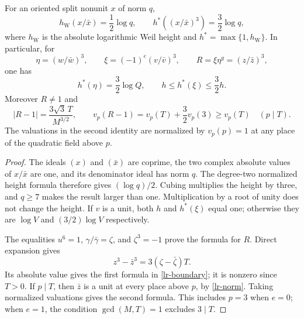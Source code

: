 \begin{lemma}\label{lr-heights}
For an oriented split nonunit $x$ of norm $q$,
\[
 h_{\mathrm W}(x/\bar x)=\frac12\log q,\qquad
 h^*((x/\bar x)^3)=\frac32\log q,
\]
where $h_{\mathrm W}$ is the absolute logarithmic Weil height and
$h^*=\max\{1,h_{\mathrm W}\}$. In particular, for
\[
 \eta=(w/\bar w)^3,\qquad \xi=(-1)^e(v/\bar v)^3,
 \qquad R=\xi\eta^g=(z/\bar z)^3,
\]
one has
\begin{equation}\label{lr-height-bounds}
 h^*(\eta)=\frac32\log Q,\qquad h\le h^*(\xi)\le\frac32h.
\end{equation}
Moreover $R\ne1$ and
\begin{equation}\label{lr-boundary}
 |R-1|=\frac{3\sqrt3\,T}{M^{3/2}},\qquad
 v_p(R-1)=v_p(T)+\frac32v_p(3)\ge v_p(T)\quad(p\mid T).
\end{equation}
The valuations in the second identity are normalized by $v_p(p)=1$ at
any place of the quadratic field above $p$.
\end{lemma}
\begin{proof}
The ideals $(x)$ and $(\bar x)$ are coprime, the two complex absolute values
of $x/\bar x$ are one, and its denominator ideal has norm $q$. The degree-two
normalized height formula therefore gives $(\log q)/2$. Cubing multiplies
the height by three, and $q\ge7$ makes the result larger than one.
Multiplication by a root of unity does not change the height. If $v$ is a
unit, both $h$ and $h^*(\xi)$ equal one; otherwise they are $\log V$ and
$(3/2)\log V$ respectively.

The equalities $u^6=1$, $\gamma/\bar\gamma=\zeta$, and $\zeta^3=-1$
prove the formula for $R$. Direct expansion gives
\[
 z^3-\bar z^3=3(\zeta-\bar\zeta)T.
\]
Its absolute value gives the first formula in \eqref{lr-boundary}; it is
nonzero since $T>0$. If $p\mid T$, then $\bar z$ is a unit at every place
above $p$, by \eqref{lr-norm}. Taking normalized valuations gives the
second formula. This includes $p=3$ when $e=0$; when $e=1$, the condition
$\gcd(M,T)=1$ excludes $3\mid T$.
\end{proof}

